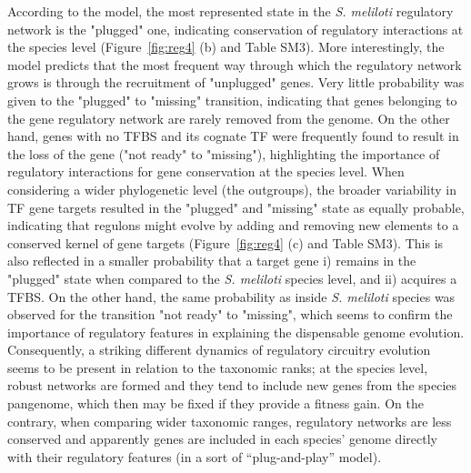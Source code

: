 According to the model, the most represented state in the \textit{S. meliloti} regulatory network is the "plugged" one, indicating conservation of regulatory interactions at the species level (Figure~\ref{fig:reg4} (b) and Table SM3).
More interestingly, the model predicts that the most frequent way through which the regulatory network grows is through the recruitment of "unplugged" genes.
 Very little probability was given to the "plugged" to "missing" transition, indicating that genes belonging to the gene regulatory network are rarely removed from the genome.
 On the other hand, genes with no TFBS and its cognate TF were frequently found to result in the loss of the gene ("not ready" to "missing"), highlighting the importance of regulatory interactions for gene conservation at the species level.
 When considering a wider phylogenetic level (the outgroups), the broader variability in TF gene targets resulted in the "plugged" and "missing" state as equally probable, indicating that regulons might evolve by adding and removing new elements to a conserved kernel of gene targets (Figure~\ref{fig:reg4} (c) and Table SM3).
 This is also reflected in a smaller probability that a target gene i) remains in the "plugged" state when compared to the \textit{S. meliloti} species level, and ii) acquires a TFBS.
 On the other hand, the same probability as inside \textit{S. meliloti} species was observed for the transition "not ready" to "missing", which seems to confirm the importance of regulatory features in explaining the dispensable genome evolution.
 Consequently, a striking different dynamics of regulatory circuitry evolution seems to be present in relation to the taxonomic ranks; at the species level, robust networks are formed and they tend to include new genes from the species pangenome, which then may be fixed if they provide a fitness gain.
On the contrary, when comparing wider taxonomic ranges, regulatory networks are less conserved and apparently genes are included in each species' genome directly with their regulatory features (in a sort of “plug-and-play” model).


